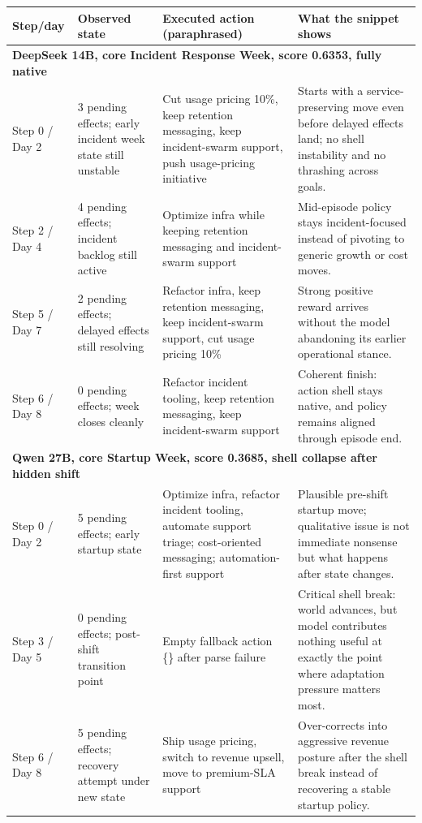 \begin{table}[tbp]
  \centering
  \footnotesize
  \setlength{\tabcolsep}{4pt}
  \begin{tabular}{p{}p{}p{}p{}}
    \toprule
    Step/day & Observed state & Executed action (paraphrased) & What the snippet shows \\
    \midrule
    \multicolumn{4}{l}{\textbf{DeepSeek 14B, core Incident Response Week, score 0.6353, fully native}} \\
    Step 0 / Day 2 & 3 pending effects; early incident week state still unstable & Cut usage pricing 10\%, keep retention messaging, keep incident-swarm support, push usage-pricing initiative & Starts with a service-preserving move even before delayed effects land; no shell instability and no thrashing across goals. \\
    Step 2 / Day 4 & 4 pending effects; incident backlog still active & Optimize infra while keeping retention messaging and incident-swarm support & Mid-episode policy stays incident-focused instead of pivoting to generic growth or cost moves. \\
    Step 5 / Day 7 & 2 pending effects; delayed effects still resolving & Refactor infra, keep retention messaging, keep incident-swarm support, cut usage pricing 10\% & Strong positive reward arrives without the model abandoning its earlier operational stance. \\
    Step 6 / Day 8 & 0 pending effects; week closes cleanly & Refactor incident tooling, keep retention messaging, keep incident-swarm support & Coherent finish: action shell stays native, and policy remains aligned through episode end. \\
    \midrule
    \multicolumn{4}{l}{\textbf{Qwen 27B, core Startup Week, score 0.3685, shell collapse after hidden shift}} \\
    Step 0 / Day 2 & 5 pending effects; early startup state & Optimize infra, refactor incident tooling, automate support triage; cost-oriented messaging; automation-first support & Plausible pre-shift startup move; qualitative issue is not immediate nonsense but what happens after state changes. \\
    Step 3 / Day 5 & 0 pending effects; post-shift transition point & Empty fallback action \{\} after parse failure & Critical shell break: world advances, but model contributes nothing useful at exactly the point where adaptation pressure matters most. \\
    Step 6 / Day 8 & 5 pending effects; recovery attempt under new state & Ship usage pricing, switch to revenue upsell, move to premium-SLA support & Over-corrects into aggressive revenue posture after the shell break instead of recovering a stable startup policy. \\

\end{tabular}
\end{table}
